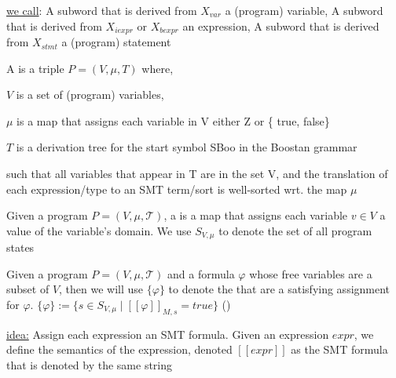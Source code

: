 \documentclass[landscape, a4paper]{article}
\begin{document}
\begin{minipage}[t]{0.2\linewidth}
\begin{betterlist}
		\begin{betterlist}
			\item \underline{we call}: A subword that is derived from $X_{var}$ a (program) \alert{variable}, A subword that is derived from $X_{iexpr}$ or $X_{bexpr}$ an \alert{expression}, A subword that is derived from $X_{stmt}$ a (program) \alert{statement}
		\end{betterlist}
	\end{betterlist}
	\begin{betterlist}
		\item \color{orange}A  is a triple $P = (V , \mu , T)$ where,
		\begin{betterlist}
			\item $V$ is a set of (program) variables,
			\item $\mu$  is a map that assigns each variable in V either Z or \{ true, false\}
			\item $T$ is a derivation tree for the start symbol SBoo in the Boostan grammar
		\end{betterlist}
		such that all variables that appear in T are in the set V, and the translation of each expression/type to an SMT term/sort is well-sorted wrt. the map $\mu$\color{black}
		\item {}
		\item {}
		\item \color{orange}Given a program $P = (V , \mu, \mathcal{T})$, a  is a map that assigns each variable $v \in V$ a value of the variable’s domain. We use $S_{V, \mu}$ to denote the set of all program states\color{black}
		\begin{betterlist}
			\item \color{orange}Given a program $P = (V, \mu, \mathcal{T})$ and a formula $\varphi$ whose free variables are a subset of $V$, then we will use $\{\varphi\}$ to denote the  that are a satisfying assignment for $\varphi$. $\{ \varphi \}  := \{ s \in S_{V ,\mu} \mid [[\varphi ]]_{M,s} = true\}$ ()\color{black}
		\end{betterlist}
		\item \script{171}{Semantics of Expressions}
		\begin{betterlist}
			\item \underline{idea:} Assign each expression an SMT formula. Given an expression $expr$, we define the semantics of the expression, denoted $[[expr]]$ as the SMT formula that is denoted by the same string

\end{betterlist}
\end{betterlist}
\end{minipage}
\end{document}
